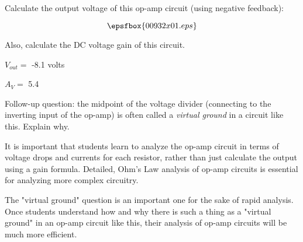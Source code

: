 

Calculate the output voltage of this op-amp circuit (using negative feedback):

$$\epsfbox{00932x01.eps}$$

Also, calculate the DC voltage gain of this circuit.







$V_{out} =$ -8.1 volts

\vskip 10pt

$A_V =$ 5.4 

\vskip 10pt

Follow-up question: the midpoint of the voltage divider (connecting to the inverting input of the op-amp) is often called a {\it virtual ground} in a circuit like this.  Explain why.







It is important that students learn to analyze the op-amp circuit in terms of voltage drops and currents for each resistor, rather than just calculate the output using a gain formula.  Detailed, Ohm's Law analysis of op-amp circuits is essential for analyzing more complex circuitry.

The "virtual ground" question is an important one for the sake of rapid analysis.  Once students understand how and why there is such a thing as a "virtual ground" in an op-amp circuit like this, their analysis of op-amp circuits will be much more efficient.




